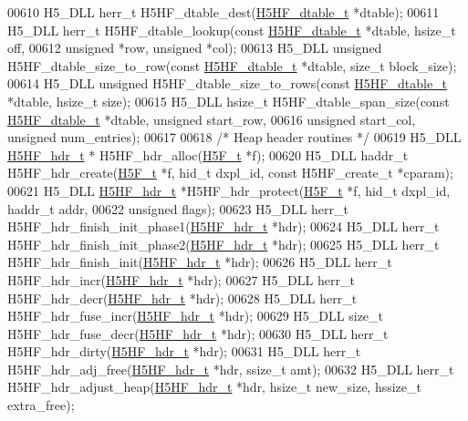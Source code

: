 \begin{DoxyCode}
00610 H5\_DLL herr\_t H5HF\_dtable\_dest(\hyperlink{struct_h5_h_f__dtable__t}{H5HF\_dtable\_t} *dtable);
00611 H5\_DLL herr\_t H5HF\_dtable\_lookup(\textcolor{keyword}{const} \hyperlink{struct_h5_h_f__dtable__t}{H5HF\_dtable\_t} *dtable, hsize\_t off,
00612     \textcolor{keywordtype}{unsigned} *row, \textcolor{keywordtype}{unsigned} *col);
00613 H5\_DLL \textcolor{keywordtype}{unsigned} H5HF\_dtable\_size\_to\_row(\textcolor{keyword}{const} \hyperlink{struct_h5_h_f__dtable__t}{H5HF\_dtable\_t} *dtable, \textcolor{keywordtype}{size\_t} block\_size);
00614 H5\_DLL \textcolor{keywordtype}{unsigned} H5HF\_dtable\_size\_to\_rows(\textcolor{keyword}{const} \hyperlink{struct_h5_h_f__dtable__t}{H5HF\_dtable\_t} *dtable, hsize\_t size);
00615 H5\_DLL hsize\_t H5HF\_dtable\_span\_size(\textcolor{keyword}{const} \hyperlink{struct_h5_h_f__dtable__t}{H5HF\_dtable\_t} *dtable, \textcolor{keywordtype}{unsigned} start\_row,
00616     \textcolor{keywordtype}{unsigned} start\_col, \textcolor{keywordtype}{unsigned} num\_entries);
00617 
00618 \textcolor{comment}{/* Heap header routines */}
00619 H5\_DLL \hyperlink{struct_h5_h_f__hdr__t}{H5HF\_hdr\_t} * H5HF\_hdr\_alloc(\hyperlink{struct_h5_f__t}{H5F\_t} *f);
00620 H5\_DLL haddr\_t H5HF\_hdr\_create(\hyperlink{struct_h5_f__t}{H5F\_t} *f, hid\_t dxpl\_id, \textcolor{keyword}{const} H5HF\_create\_t *cparam);
00621 H5\_DLL \hyperlink{struct_h5_h_f__hdr__t}{H5HF\_hdr\_t} *H5HF\_hdr\_protect(\hyperlink{struct_h5_f__t}{H5F\_t} *f, hid\_t dxpl\_id, haddr\_t addr,
00622     \textcolor{keywordtype}{unsigned} flags);
00623 H5\_DLL herr\_t H5HF\_hdr\_finish\_init\_phase1(\hyperlink{struct_h5_h_f__hdr__t}{H5HF\_hdr\_t} *hdr);
00624 H5\_DLL herr\_t H5HF\_hdr\_finish\_init\_phase2(\hyperlink{struct_h5_h_f__hdr__t}{H5HF\_hdr\_t} *hdr);
00625 H5\_DLL herr\_t H5HF\_hdr\_finish\_init(\hyperlink{struct_h5_h_f__hdr__t}{H5HF\_hdr\_t} *hdr);
00626 H5\_DLL herr\_t H5HF\_hdr\_incr(\hyperlink{struct_h5_h_f__hdr__t}{H5HF\_hdr\_t} *hdr);
00627 H5\_DLL herr\_t H5HF\_hdr\_decr(\hyperlink{struct_h5_h_f__hdr__t}{H5HF\_hdr\_t} *hdr);
00628 H5\_DLL herr\_t H5HF\_hdr\_fuse\_incr(\hyperlink{struct_h5_h_f__hdr__t}{H5HF\_hdr\_t} *hdr);
00629 H5\_DLL \textcolor{keywordtype}{size\_t} H5HF\_hdr\_fuse\_decr(\hyperlink{struct_h5_h_f__hdr__t}{H5HF\_hdr\_t} *hdr);
00630 H5\_DLL herr\_t H5HF\_hdr\_dirty(\hyperlink{struct_h5_h_f__hdr__t}{H5HF\_hdr\_t} *hdr);
00631 H5\_DLL herr\_t H5HF\_hdr\_adj\_free(\hyperlink{struct_h5_h_f__hdr__t}{H5HF\_hdr\_t} *hdr, ssize\_t amt);
00632 H5\_DLL herr\_t H5HF\_hdr\_adjust\_heap(\hyperlink{struct_h5_h_f__hdr__t}{H5HF\_hdr\_t} *hdr, hsize\_t new\_size, hssize\_t extra\_free);

\end{DoxyCode}
